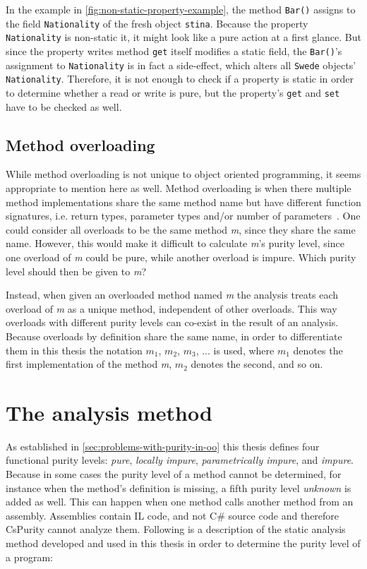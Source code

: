 \documentclass[a4paper,12pt]{article}
\begin{document}
In the example in \autoref{fig:non-static-property-example}, the method \texttt{Bar()} assigns to the field \texttt{Nationality} of the fresh object \texttt{stina}. Because the property \texttt{Nationality} is non-static it, it might look like a pure action at a first glance. But since the property writes method \texttt{get} itself modifies a static field, the \texttt{Bar()}'s assignment to \texttt{Nationality} is in fact a side-effect, which alters all \texttt{Swede} objects' \texttt{Nationality}. Therefore, it is not enough to check if a property is static in order to determine whether a read or write is pure, but the property's \texttt{get} and \texttt{set} have to be checked as well.


\subsection{Method overloading} \label{sub:Method-overloading}
While method overloading is not unique to object oriented programming, it seems appropriate to mention here as well. Method overloading is when there multiple method implementations share the same method name but have different function signatures, i.e. return types, parameter types and/or number of parameters~\cite{albahari2003nutshell}. One could consider all overloads to be the same method \textit{m}, since they share the same name. However, this would make it difficult to calculate \textit{m}'s purity level, since one overload of \textit{m} could be pure, while another overload is impure. Which purity level should then be given to \textit{m}?

Instead, when given an overloaded method named \textit{m} the analysis treats each overload of \textit{m} as a unique method, independent of other overloads. This way overloads with different purity levels can co-exist in the result of an analysis. Because overloads by definition share the same name, in order to differentiate them in this thesis the notation $m_1$, $m_2$, $m_3$, ... is used, where $m_1$ denotes the first implementation of the method \textit{m}, $m_2$ denotes the second, and so on.

\section{The analysis method} \label{sec:the-analysis-method}

As established in \autoref{sec:problems-with-purity-in-oo} this thesis defines four functional purity levels: \textit{pure}, \textit{locally impure}, \textit{parametrically impure}, and \textit{impure}. Because in some cases the purity level of a method cannot be determined, for instance when the method's definition is missing, a fifth purity level \textit{unknown} is added as well. This can happen when one method calls another method from an assembly. Assemblies contain IL code, and not C\# source code and therefore CsPurity cannot analyze them. Following is a description of the static analysis method developed and used in this thesis in order to determine the purity level of a program:
\end{document}
